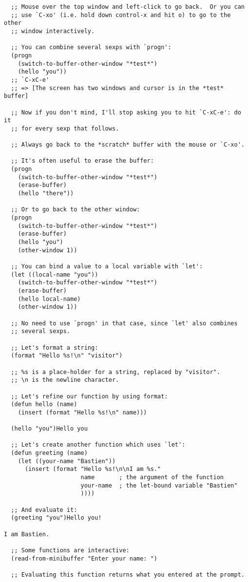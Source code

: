 \documentclass[11pt]{ctexart}
\begin{document}
{{{{\begin{lstlisting}
  ;; Mouse over the top window and left-click to go back.  Or you can
  ;; use `C-xo' (i.e. hold down control-x and hit o) to go to the other
  ;; window interactively.

  ;; You can combine several sexps with `progn':
  (progn
    (switch-to-buffer-other-window "*test*")
    (hello "you"))
  ;; `C-xC-e'
  ;; => [The screen has two windows and cursor is in the *test* buffer]

  ;; Now if you don't mind, I'll stop asking you to hit `C-xC-e': do it
  ;; for every sexp that follows.

  ;; Always go back to the *scratch* buffer with the mouse or `C-xo'.

  ;; It's often useful to erase the buffer:
  (progn
    (switch-to-buffer-other-window "*test*")
    (erase-buffer)
    (hello "there"))

  ;; Or to go back to the other window:
  (progn
    (switch-to-buffer-other-window "*test*")
    (erase-buffer)
    (hello "you")
    (other-window 1))

  ;; You can bind a value to a local variable with `let':
  (let ((local-name "you"))
    (switch-to-buffer-other-window "*test*")
    (erase-buffer)
    (hello local-name)
    (other-window 1))

  ;; No need to use `progn' in that case, since `let' also combines
  ;; several sexps.

  ;; Let's format a string:
  (format "Hello %s!\n" "visitor")

  ;; %s is a place-holder for a string, replaced by "visitor".
  ;; \n is the newline character.

  ;; Let's refine our function by using format:
  (defun hello (name)
    (insert (format "Hello %s!\n" name)))

  (hello "you")Hello you

  ;; Let's create another function which uses `let':
  (defun greeting (name)
    (let ((your-name "Bastien"))
      (insert (format "Hello %s!\n\nI am %s."
                      name       ; the argument of the function
                      your-name  ; the let-bound variable "Bastien"
                      ))))

  ;; And evaluate it:
  (greeting "you")Hello you!

I am Bastien.

  ;; Some functions are interactive:
  (read-from-minibuffer "Enter your name: ")

  ;; Evaluating this function returns what you entered at the prompt.


\end{lstlisting}}}}}
\end{document}
